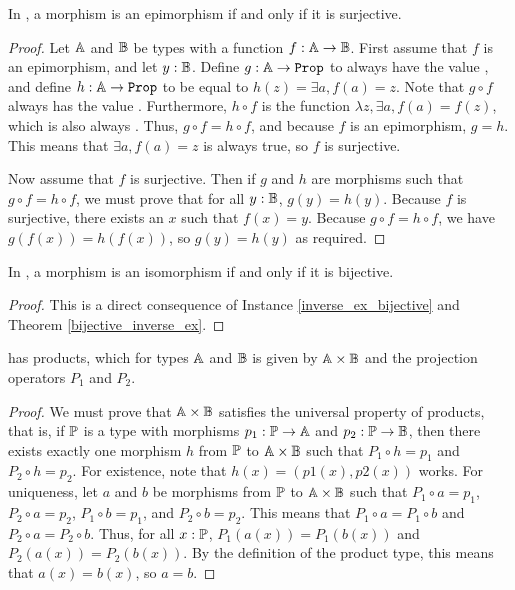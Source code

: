 \documentclass[../../math.tex]{subfiles}
\begin{document}
\begin{theorem}
    In \Type, a morphism is an epimorphism if and only if it is surjective.
\end{theorem}
\begin{proof}
    Let $\A$ and $\B$ be types with a function $f : \A \to \B$.  First assume
    that $f$ is an epimorphism, and let $y : \B$.  Define $g : \A \to \Prop$ to
    always have the value , and define $h : \A \to \Prop$ to be equal
    to $h(z) = \exists a, f(a) = z$.  Note that $g \circ f$ always has the value
    .  Furthermore, $h \circ f$ is the function $\lambda z, \exists a,
    f(a) = f(z)$, which is also always .  Thus, $g \circ f = h \circ
    f$, and because $f$ is an epimorphism, $g = h$.  This means that $\exists a,
    f(a) = z$ is always true, so $f$ is surjective.

    Now assume that $f$ is surjective.  Then if $g$ and $h$ are morphisms such
    that $g \circ f = h \circ f$, we must prove that for all $y : \B$, $g(y) =
    h(y)$.  Because $f$ is surjective, there exists an $x$ such that $f(x) = y$.
    Because $g \circ f = h \circ f$, we have $g(f(x)) = h(f(x))$, so $g(y) =
    h(y)$ as required.
\end{proof}

\begin{theorem}
    In \Type, a morphism is an isomorphism if and only if it is bijective.
\end{theorem}
\begin{proof}
    This is a direct consequence of Instance \ref{inverse_ex_bijective} and
    Theorem \ref{bijective_inverse_ex}.
\end{proof}

\begin{theorem}
    \Type has products, which for types $\A$ and $\B$ is given by $\A \times \B$
    and the projection operators $P_1$ and $P_2$.
\end{theorem}
\begin{proof}
    We must prove that $\A \times \B$ satisfies the universal property of
    products, that is, if $\P$ is a type with morphisms $p_1 : \P \to \A$ and
    $p_2 : \P \to \B$, then there exists exactly one morphism $h$ from $\P$ to
    $\A \times \B$ such that $P_1 \circ h = p_1$ and $P_2 \circ h = p_2$.
    For existence, note that $h(x) = (p1(x), p2(x))$ works.  For uniqueness, let
    $a$ and $b$ be morphisms from $\P$ to $\A \times \B$ such that $P_1 \circ a
    = p_1$, $P_2 \circ a = p_2$, $P_1 \circ b = p_1$, and $P_2 \circ b = p_2$.
    This means that $P_1 \circ a = P_1 \circ b$ and $P_2 \circ a = P_2 \circ b$.
    Thus, for all $x : \P$, $P_1(a(x)) = P_1(b(x))$ and $P_2(a(x)) = P_2(b(x))$.
    By the definition of the product type, this means that $a(x) = b(x)$, so $a
    = b$.
\end{proof}
\end{document}
